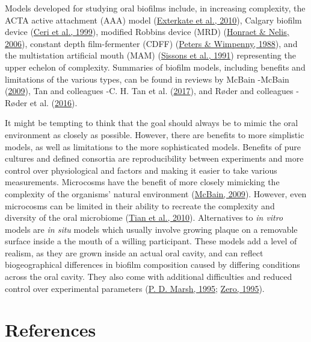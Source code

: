 \documentclass[
  letterpaper,
]{book}
\begin{document}
Models developed for studying oral biofilms include, in increasing
complexity, the ACTA active attachment (AAA) model
(\protect\hyperlink{ref-extercateAAA2010}{Exterkate et al., 2010}),
Calgary biofilm device
(\protect\hyperlink{ref-ceriCalgaryBiofilm1999}{Ceri et al., 1999}),
modified Robbins device (MRD)
(\protect\hyperlink{ref-honraetModifiedRobbins2006}{Honraet \& Nelis,
2006}), constant depth film-fermenter (CDFF)
(\protect\hyperlink{ref-petersConstantDepth1988}{Peters \& Wimpenny,
1988}), and the multistation artificial mouth (MAM)
(\protect\hyperlink{ref-sissonsMultistationPlaque1991}{Sissons et al.,
1991}) representing the upper echelon of complexity. Summaries of
biofilm models, including benefits and limitations of the various types,
can be found in reviews by McBain -McBain
(\protect\hyperlink{ref-mcbainBiofilmModels2009}{2009}), Tan and
colleagues -C. H. Tan et al.
(\protect\hyperlink{ref-tanAllTogether2017}{2017}), and Røder and
colleagues -Røder et al.
(\protect\hyperlink{ref-roderStudyingBacterial2016}{2016}).

It might be tempting to think that the goal should always be to mimic
the oral environment as closely as possible. However, there are benefits
to more simplistic models, as well as limitations to the more
sophisticated models. Benefits of pure cultures and defined consortia
are reproducibility between experiments and more control over
physiological and factors and making it easier to take various
measurements. Microcosms have the benefit of more closely mimicking the
complexity of the organisms' natural environment
(\protect\hyperlink{ref-mcbainBiofilmModels2009}{McBain, 2009}).
However, even microcosms can be limited in their ability to recreate the
complexity and diversity of the oral microbiome
(\protect\hyperlink{ref-tianUsingDGGE2010}{Tian et al., 2010}).
Alternatives to \emph{in vitro} models are \emph{in situ} models which
usually involve growing plaque on a removable surface inside a the mouth
of a willing participant. These models add a level of realism, as they
are grown inside an actual oral cavity, and can reflect biogeographical
differences in biofilm composition caused by differing conditions across
the oral cavity. They also come with additional difficulties and reduced
control over experimental parameters
(\protect\hyperlink{ref-marshRoleMicrobiology1995}{P. D. Marsh, 1995};
\protect\hyperlink{ref-zeroSituCaries1995}{Zero, 1995}).

\hypertarget{references-1}{%
\section*{References}\label{references-1}}
\end{document}
